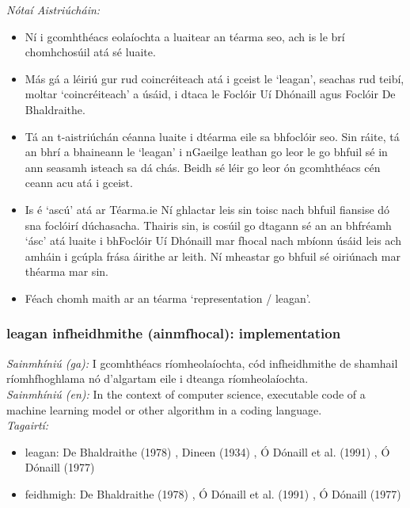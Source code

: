  \noindent \textit{Nótaí Aistriúcháin:}
\begin{itemize}
	\item Ní i gcomhthéacs eolaíochta a luaitear an téarma seo, ach is le brí chomhchosúil atá sé luaite.
	\item Más gá a léiriú gur rud coincréiteach atá i gceist le `leagan', seachas rud teibí, moltar `coincréiteach' a úsáid, i dtaca le Foclóir Uí Dhónaill agus Foclóir De Bhaldraithe.
	\item Tá an t-aistriúchán céanna luaite i dtéarma eile sa bhfoclóir seo. Sin ráite, tá an bhrí a bhaineann le `leagan' i nGaeilge leathan go leor le go bhfuil sé in ann seasamh isteach sa dá chás. Beidh sé léir go leor ón gcomhthéacs cén ceann acu atá i gceist.
	\item Is é `ascú' atá ar Téarma.ie Ní ghlactar leis sin toisc nach bhfuil fiansise dó sna foclóirí dúchasacha. Thairis sin, is cosúil go dtagann sé an an bhfréamh `ásc' atá luaite i bhFoclóir Uí Dhónaill mar fhocal nach mbíonn úsáid leis ach amháin i gcúpla frása áirithe ar leith. Ní mheastar go bhfuil sé  oiriúnach mar théarma mar sin.
	\item Féach chomh maith ar an téarma `representation / leagan'.
\end{itemize}


\subsubsection*{leagan infheidhmithe (ainmfhocal): implementation}
 \noindent \textit{Sainmhíniú (ga):} I gcomhthéacs ríomheolaíochta, cód infheidhmithe de shamhail ríomhfhoghlama nó d'algartam eile i dteanga ríomheolaíochta.
\\
 \noindent \textit{Sainmhíniú (en):} In the context of computer science, executable code of a machine learning model or other algorithm in a coding language.
\\
 \noindent \textit{Tagairtí:}
\begin{itemize}
	\item leagan: De Bhaldraithe (1978) \cite{de-bhaldraithe}, Dineen (1934) \cite{dineen}, Ó Dónaill et al. (1991) \cite{focloir-beag}, Ó Dónaill (1977) \cite{odonaill}
	\item feidhmigh: De Bhaldraithe (1978) \cite{de-bhaldraithe}, Ó Dónaill et al. (1991) \cite{focloir-beag}, Ó Dónaill (1977) \cite{odonaill}
\end{itemize}


